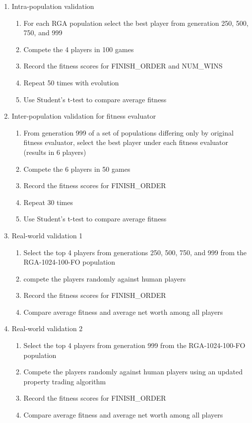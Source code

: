\begin{enumerate}
  \item {Intra-population validation}
  \begin{enumerate}
    \item {For each RGA population select the best player from generation 250,
    500, 750, and 999}
    \item {Compete the 4 players in 100 games}
    \item {Record the fitness scores for FINISH\_ORDER and NUM\_WINS}
    \item {Repeat 50 times with evolution}
    \item {Use Student's t-test to compare average fitness}
  \end{enumerate}
  \item {Inter-population validation for fitness evaluator}
  \begin{enumerate}
    \item {From generation 999 of a set of populations differing only by
    original fitness evaluator, select the best player under each fitness
    evaluator (results in 6 players)}
    \item {Compete the 6 players in 50 games}
    \item {Record the fitness scores for FINISH\_ORDER}
    \item {Repeat 30 times}
    \item {Use Student's t-test to compare average fitness}
  \end {enumerate}
  \item {Real-world validation 1}
  \begin{enumerate}
    \item {Select the top 4 players from generations 250, 500, 750, and 999 from
    the RGA-1024-100-FO population}
    \item {compete the players randomly against human players}
    \item {Record the fitness scores for FINISH\_ORDER}
    \item {Compare average fitness and average net worth among all players}
  \end {enumerate}
  \item {Real-world validation 2}
  \begin{enumerate}
    \item {Select the top 4 players from generation 999 from the RGA-1024-100-FO
    population}
    \item {Compete the players randomly against human players using an updated
    property trading algorithm}
    \item {Record the fitness scores for FINISH\_ORDER}
    \item {Compare average fitness and average net worth among all players}
  \end {enumerate}
\end{enumerate}

